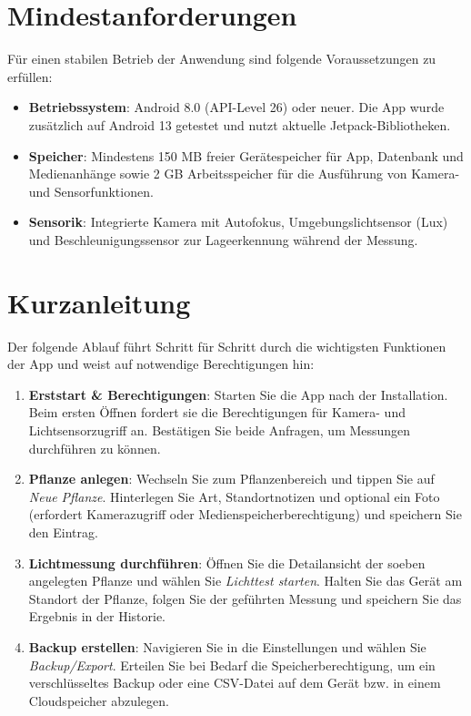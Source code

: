 \documentclass[14pt,a4paper]{report}
\begin{document}
\section{Mindestanforderungen}
Für einen stabilen Betrieb der Anwendung sind folgende Voraussetzungen zu erfüllen:
\begin{itemize}
    \item \textbf{Betriebssystem}: Android 8.0 (API-Level 26) oder neuer. Die App wurde zusätzlich auf Android 13 getestet und nutzt aktuelle Jetpack-Bibliotheken.
    \item \textbf{Speicher}: Mindestens 150 MB freier Gerätespeicher für App, Datenbank und Medienanhänge sowie 2 GB Arbeitsspeicher für die Ausführung von Kamera- und Sensorfunktionen.
    \item \textbf{Sensorik}: Integrierte Kamera mit Autofokus, Umgebungslichtsensor (Lux) und Beschleunigungssensor zur Lageerkennung während der Messung.
\end{itemize}

\section{Kurzanleitung}
Der folgende Ablauf führt Schritt für Schritt durch die wichtigsten Funktionen der App und weist auf notwendige Berechtigungen hin:
\begin{enumerate}
    \item \textbf{Erststart \& Berechtigungen}: Starten Sie die App nach der Installation. Beim ersten Öffnen fordert sie die Berechtigungen für Kamera- und Lichtsensorzugriff an. Bestätigen Sie beide Anfragen, um Messungen durchführen zu können.
    \item \textbf{Pflanze anlegen}: Wechseln Sie zum Pflanzenbereich und tippen Sie auf \textit{Neue Pflanze}. Hinterlegen Sie Art, Standortnotizen und optional ein Foto (erfordert Kamerazugriff oder Medienspeicherberechtigung) und speichern Sie den Eintrag.
    \item \textbf{Lichtmessung durchführen}: Öffnen Sie die Detailansicht der soeben angelegten Pflanze und wählen Sie \textit{Lichttest starten}. Halten Sie das Gerät am Standort der Pflanze, folgen Sie der geführten Messung und speichern Sie das Ergebnis in der Historie.
    \item \textbf{Backup erstellen}: Navigieren Sie in die Einstellungen und wählen Sie \textit{Backup/Export}. Erteilen Sie bei Bedarf die Speicherberechtigung, um ein verschlüsseltes Backup oder eine CSV-Datei auf dem Gerät bzw. in einem Cloudspeicher abzulegen.
\end{enumerate}
\end{document}
